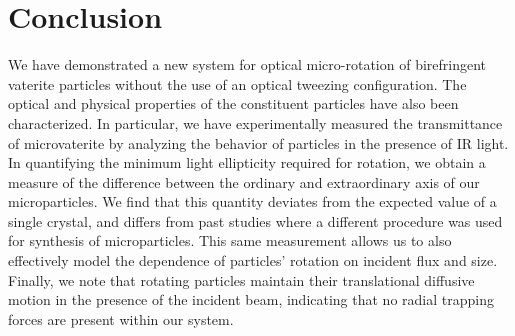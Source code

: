 \section*{Conclusion}
We have demonstrated a new system for optical micro-rotation of birefringent vaterite particles without the use of an optical tweezing configuration. The optical and physical properties of the constituent particles have also been characterized. In particular, we have experimentally measured the transmittance of microvaterite by analyzing the behavior of particles in the presence of IR light. In quantifying the minimum light ellipticity required for rotation, we obtain a measure of the difference between the ordinary and extraordinary axis of our microparticles. We find that this quantity deviates from the expected value of a single crystal, and differs from past studies where a different procedure was used for synthesis of microparticles. This same measurement allows us to also effectively model the dependence of particles' rotation on incident flux and size. Finally, we note that rotating particles maintain their translational diffusive motion in the presence of the incident beam, indicating that no radial trapping forces are present within our system.
